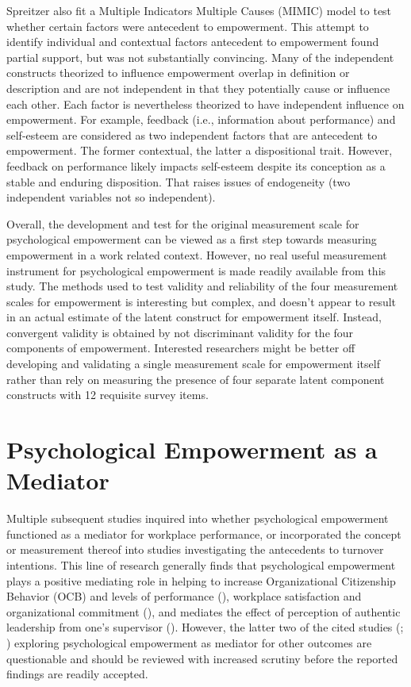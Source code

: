 \documentclass[
  11pt,
  a4paper,
]{article}
\begin{document}
Spreitzer also fit a Multiple Indicators Multiple Causes (MIMIC) model
to test whether certain factors were antecedent to empowerment. This
attempt to identify individual and contextual factors antecedent to
empowerment found partial support, but was not substantially convincing.
Many of the independent constructs theorized to influence empowerment
overlap in definition or description and are not independent in that
they potentially cause or influence each other. Each factor is
nevertheless theorized to have independent influence on empowerment. For
example, feedback (i.e., information about performance) and self-esteem
are considered as two independent factors that are antecedent to
empowerment. The former contextual, the latter a dispositional trait.
However, feedback on performance likely impacts self-esteem despite its
conception as a stable and enduring disposition. That raises issues of
endogeneity (two independent variables not so independent).

Overall, the development and test for the original measurement scale for
psychological empowerment can be viewed as a first step towards
measuring empowerment in a work related context. However, no real useful
measurement instrument for psychological empowerment is made readily
available from this study. The methods used to test validity and
reliability of the four measurement scales for empowerment is
interesting but complex, and doesn't appear to result in an actual
estimate of the latent construct for empowerment itself. Instead,
convergent validity is obtained by not discriminant validity for the
four components of empowerment. Interested researchers might be better
off developing and validating a single measurement scale for empowerment
itself rather than rely on measuring the presence of four separate
latent component constructs with 12 requisite survey items.

\section{Psychological Empowerment as a
Mediator}\label{psychological-empowerment-as-a-mediator}

Multiple subsequent studies inquired into whether psychological
empowerment functioned as a mediator for workplace performance, or
incorporated the concept or measurement thereof into studies
investigating the antecedents to turnover intentions. This line of
research generally finds that psychological empowerment plays a positive
mediating role in helping to increase Organizational Citizenship
Behavior (OCB) and levels of performance
(), workplace satisfaction and
organizational commitment (), and mediates the effect of perception of authentic
leadership from one's supervisor
(). However, the latter two of the cited studies
(;
) exploring psychological empowerment as mediator for other
outcomes are questionable and should be reviewed with increased scrutiny
before the reported findings are readily accepted.
\end{document}
